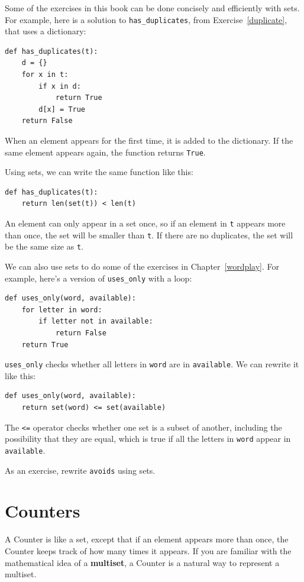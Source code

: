 \documentclass[10pt]{book}
\begin{document}
Some of the exercises in this book can be done concisely and
efficiently with sets.  For example, here is a solution to
\verb"has_duplicates", from
Exercise~\ref{duplicate}, that uses a dictionary:

\begin{verbatim}
def has_duplicates(t):
    d = {}
    for x in t:
        if x in d:
            return True
        d[x] = True
    return False
\end{verbatim}

When an element appears for the first time, it is added to the
dictionary.  If the same element appears again, the function returns
{\tt True}.

Using sets, we can write the same function like this:

\begin{verbatim}
def has_duplicates(t):
    return len(set(t)) < len(t)
\end{verbatim}
%
An element can only appear in a set once, so if an element in {\tt t}
appears more than once, the set will be smaller than {\tt t}.  If there
are no duplicates, the set will be the same size as {\tt t}.

We can also use sets to do some of the exercises in
Chapter~\ref{wordplay}.  For example, here's a version of
\verb"uses_only" with a loop:

\begin{verbatim}
def uses_only(word, available):
    for letter in word: 
        if letter not in available:
            return False
    return True
\end{verbatim}
%
\verb"uses_only" checks whether all letters in {\tt word} are
in {\tt available}.  We can rewrite it like this:

\begin{verbatim}
def uses_only(word, available):
    return set(word) <= set(available)
\end{verbatim}
%
The \verb"<=" operator checks whether one set is a subset of another,
including the possibility that they are equal, which is true if all
the letters in {\tt word} appear in {\tt available}.

As an exercise, rewrite \verb"avoids" using sets.


\section{Counters}

A Counter is like a set, except that if an element appears more
than once, the Counter keeps track of how many times it appears.
If you are familiar with the mathematical idea of a {\bf multiset},
a Counter is a natural way to represent a multiset.
\end{document}
